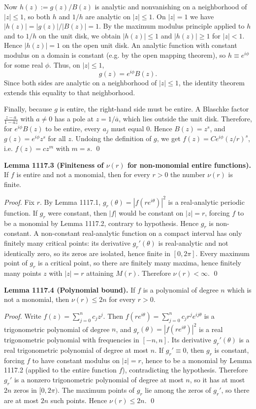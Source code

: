 Now \(h(z):=g(z)/B(z)\) is analytic and nonvanishing on a neighborhood of \(|z|\le 1\), so both \(h\) and \(1/h\) are analytic on \(|z|\le 1\). On \(|z|=1\) we have \(|h(z)|=|g(z)|/|B(z)|=1\). By the maximum modulus principle applied to \(h\) and to \(1/h\) on the unit disk, we obtain
\(|h(z)|\le 1\) and \(|h(z)|\ge 1\) for \(|z|<1\). Hence \(|h(z)|=1\) on the open unit disk. An analytic function with constant modulus on a domain is constant (e.g. by the open mapping theorem), so \(h\equiv e^{i\phi}\) for some real \(\phi\).
Thus, on \(|z|\le 1\),
\[
 g(z)=e^{i\phi} B(z).
\]
Since both sides are analytic on a neighborhood of \(|z|\le 1\), the identity theorem extends this equality to that neighborhood.

Finally, because \(g\) is entire, the right-hand side must be entire. A Blaschke factor \(\frac{z-a}{1-\overline{a}z}\) with \(a\ne 0\) has a pole at \(z=1/\overline{a}\), which lies outside the unit disk. Therefore, for \(e^{i\phi}B(z)\) to be entire, every \(a_j\) must equal \(0\). Hence \(B(z)=z^s\), and \(g(z)=e^{i\phi} z^s\) for all \(z\). Undoing the definition of \(g\), we get
\(f(z)=C e^{i\phi} (z/r)^s\), i.e. \(f(z)=c z^m\) with \(m=s\). \qed

\textbf{Lemma 1117.3 (Finiteness of \(\nu(r)\) for non-monomial entire functions).}
If \(f\) is entire and not a monomial, then for every \(r>0\) the number \(\nu(r)\) is finite.

\emph{Proof.}
Fix \(r\). By Lemma 1117.1, \(g_r(\theta)=|f(r e^{i\theta})|^2\) is a real-analytic periodic function. If \(g_r\) were constant, then \(|f|\) would be constant on \(|z|=r\), forcing \(f\) to be a monomial by Lemma 1117.2, contrary to hypothesis. Hence \(g_r\) is non-constant.
A non-constant real-analytic function on a compact interval has only finitely many critical points: its derivative \(g_r'(\theta)\) is real-analytic and not identically zero, so its zeros are isolated, hence finite in \([0,2\pi]\).
Every maximum point of \(g_r\) is a critical point, so there are finitely many maxima, hence finitely many points \(z\) with \(|z|=r\) attaining \(M(r)\). Therefore \(\nu(r)<\infty\). \qed

\textbf{Lemma 1117.4 (Polynomial bound).}
If \(f\) is a polynomial of degree \(n\) which is not a monomial, then \(\nu(r)\le 2n\) for every \(r>0\).

\emph{Proof.}
Write \(f(z)=\sum_{j=0}^n c_j z^j\). Then
\(f(r e^{i\theta})=\sum_{j=0}^n c_j r^j e^{ij\theta}\) is a trigonometric polynomial of degree \(n\), and
\(g_r(\theta)=|f(r e^{i\theta})|^2\) is a real trigonometric polynomial with frequencies in \([-n,n]\). Its derivative \(g_r'(\theta)\) is a real trigonometric polynomial of degree at most \(n\). If \(g_r'\equiv 0\), then \(g_r\) is constant, forcing \(f\) to have constant modulus on \(|z|=r\), hence to be a monomial by Lemma 1117.2 (applied to the entire function \(f\)), contradicting the hypothesis. Therefore \(g_r'\) is a nonzero trigonometric polynomial of degree at most \(n\), so it has at most \(2n\) zeros in \([0,2\pi)\).
The maximum points of \(g_r\) lie among the zeros of \(g_r'\), so there are at most \(2n\) such points. Hence \(\nu(r)\le 2n\). \qed

